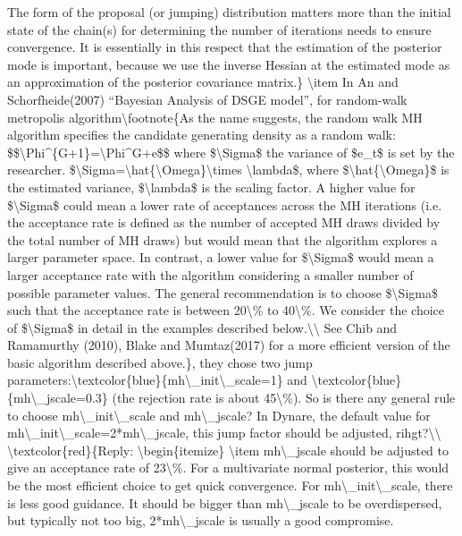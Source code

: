 \documentclass[10pt,math=newtx,citestyle=gb7714-2015,bibstyle=gb7714-2015]{elegantbook}
\begin{document}
	The form of the proposal (or jumping) distribution matters more than the initial state of the chain(s) for determining the number of iterations needs to ensure convergence. It is essentially in this respect that the estimation of the posterior mode is important, because we use the inverse Hessian at the estimated mode as an approximation of the posterior covariance matrix.\}
	\textbackslash{}item In An and Schorfheide(2007) ``Bayesian Analysis of DSGE model'', for random-walk metropolis algorithm\textbackslash{}footnote\{As the name suggests, the random walk MH algorithm specifies the candidate generating density as a random walk:
	\$\$\textbackslash{}Phi\^{}\{G+1\}=\textbackslash{}Phi\^{}G+e\$\$
	where \$\textbackslash{}Sigma\$ the variance of \$e\_t\$ is set by the researcher. \$\textbackslash{}Sigma=\textbackslash{}hat\{\textbackslash{}Omega\}\textbackslash{}times \textbackslash{}lambda\$, where \$\textbackslash{}hat\{\textbackslash{}Omega\}\$ is the estimated variance, \$\textbackslash{}lambda\$ is the scaling factor. A higher value for \$\textbackslash{}Sigma\$ could mean a lower rate of acceptances across the MH iterations (i.e. the acceptance rate is defined as the number of accepted MH draws divided by the total number of MH draws) but would mean that the algorithm explores a larger parameter space. In contrast, a lower value for \$\textbackslash{}Sigma\$ would mean a larger acceptance rate with the algorithm considering a smaller number of possible parameter values. The general recommendation is to choose \$\textbackslash{}Sigma\$ such that the acceptance rate is between 20\textbackslash{}\% to 40\textbackslash{}\%. We consider the choice of \$\textbackslash{}Sigma\$ in detail in the examples described below.\textbackslash{}\textbackslash{}
	See Chib and Ramamurthy (2010), Blake and Mumtaz(2017) for a more efficient version of the basic algorithm described above.\}, they chose two jump parameters:\textbackslash{}textcolor\{blue\}\{mh\textbackslash{}\_init\textbackslash{}\_scale=1\} and \textbackslash{}textcolor\{blue\}\{mh\textbackslash{}\_jscale=0.3\} (the rejection rate is about 45\textbackslash{}\%). So is there any general rule to choose mh\textbackslash{}\_init\textbackslash{}\_scale and mh\textbackslash{}\_jscale? In Dynare, the default value for mh\textbackslash{}\_init\textbackslash{}\_scale=2*mh\textbackslash{}\_jscale, this jump factor should be adjusted, rihgt?\textbackslash{}\textbackslash{}
	\textbackslash{}textcolor\{red\}\{Reply:
	\textbackslash{}begin\{itemize\}
	\textbackslash{}item mh\textbackslash{}\_jscale should be adjusted to give an acceptance rate of 23\textbackslash{}\%. For a multivariate normal posterior, this would be the most efficient choice to get quick convergence. For mh\textbackslash{}\_init\textbackslash{}\_scale, there is less good guidance. It should be bigger than mh\textbackslash{}\_jscale to be overdispersed, but typically not too big, 2*mh\textbackslash{}\_jscale is usually a good compromise.
\end{document}
